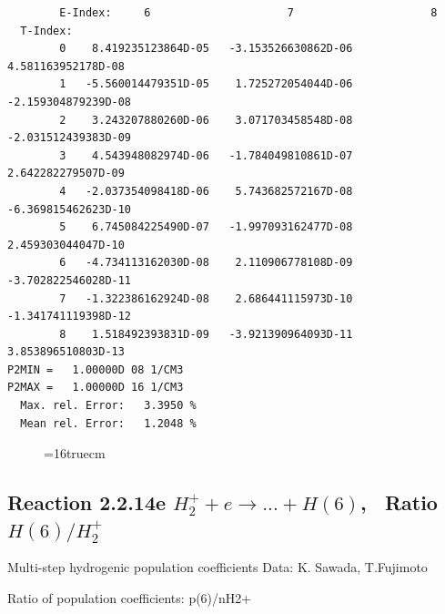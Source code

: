\documentclass[12pt,dvipdfmx]{article}
\begin{document}
\begin{small}
\begin{verbatim}
        E-Index:     6                     7                     8
  T-Index:
        0    8.419235123864D-05   -3.153526630862D-06    4.581163952178D-08
        1   -5.560014479351D-05    1.725272054044D-06   -2.159304879239D-08
        2    3.243207880260D-06    3.071703458548D-08   -2.031512439383D-09
        3    4.543948082974D-06   -1.784049810861D-07    2.642282279507D-09
        4   -2.037354098418D-06    5.743682572167D-08   -6.369815462623D-10
        5    6.745084225490D-07   -1.997093162477D-08    2.459303044047D-10
        6   -4.734113162030D-08    2.110906778108D-09   -3.702822546028D-11
        7   -1.322386162924D-08    2.686441115973D-10   -1.341741119398D-12
        8    1.518492393831D-09   -3.921390964093D-11    3.853896510803D-13
P2MIN =   1.00000D 08 1/CM3
P2MAX =   1.00000D 16 1/CM3
  Max. rel. Error:   3.3950 %
  Mean rel. Error:   1.2048 %

\end{verbatim}\end{small}
\begin{figure} \label{2.2.14d}
\epsfxsize=16truecm
\end{figure}
\newpage


\subsection{
Reaction 2.2.14e $ H_2^+ + e \rightarrow ...+ H(6) $, \   Ratio $H(6)/H_2^+  $
}

 Multi-step hydrogenic population coefficients
 Data: K. Sawada, T.Fujimoto \cite{kn:Sawada}

 Ratio of population coefficients: p(6)/nH2+
\end{document}

